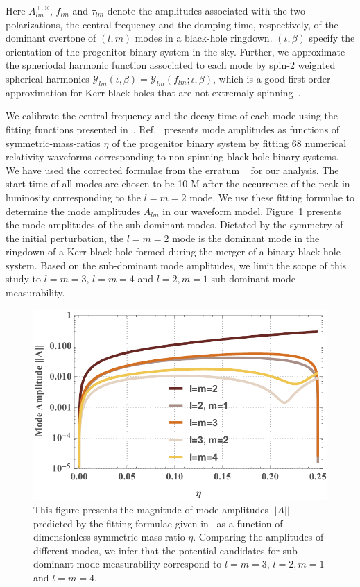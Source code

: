 Here $A_{lm}^{+, \times}$, $f_{lm}$ and $\tau_{lm}$ denote the amplitudes associated with the two polarizations, the central frequency and the damping-time, respectively, of the dominant overtone of $(l,m)$ modes in a black-hole ringdown. $(\iota, \beta)$ specify the orientation of the progenitor binary system in the sky. Further, we approximate the spheriodal harmonic function associated to each mode by spin-2 weighted spherical harmonics $\mathcal{Y}_{lm}(\iota, \beta)= \mathcal{Y}_{lm}(f_{lm};\iota, \beta)$, which is a good first order approximation for Kerr black-holes that are not extremaly spinning~\cite{2014PhRvD..90f4012B}. 


We calibrate the central frequency and the decay time of each mode using the fitting functions presented in~\cite{PhysRevD.73.064030}. Ref.~\cite{2014PhRvD..90l4032L} presents mode amplitudes as functions of symmetric-mass-ratios $\eta$ of the progenitor binary system by fitting 68 numerical relativity waveforms corresponding to non-spinning black-hole binary systems. We have used the corrected formulae from the erratum ~\cite{Lionel:comm} for our analysis. The start-time of all modes are chosen to be 10 M after the occurrence of the peak in luminosity corresponding to the $l=m=2$ mode. We use these fitting formulae to determine the mode amplitudes $A_{lm}$ in our waveform model. Figure~\ref{fig:ModeAmp} presents the mode amplitudes of the sub-dominant modes. Dictated by the symmetry of the initial perturbation, the $l=m=2$ mode is the dominant mode in the ringdown of a Kerr black-hole formed during the merger of a binary black-hole system. Based on the sub-dominant mode amplitudes, we limit the scope of this study to $l=m=3$, $l=m=4$ and $l=2, m=1$ sub-dominant mode measurability. 

\begin{figure}[h!]
\includegraphics[width=\columnwidth]{figures/amplitude.pdf}
\caption{\label{fig:ModeAmp}This figure presents the magnitude of mode amplitudes $||A||$ predicted by the fitting formulae given in~\cite{2014PhRvD..90l4032L} as a function of dimensionless symmetric-mass-ratio $\eta$. Comparing the amplitudes of different modes, we infer that the potential candidates for sub-dominant mode measurability correspond to $l=m=3$, $l=2, m=1$ and $l=m=4$.}
\end{figure}

